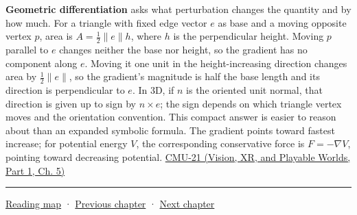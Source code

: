 \textbf{Geometric differentiation} asks what perturbation changes the quantity and by how much. For a triangle with fixed edge vector \(e\) as base and a moving opposite vertex \(p\), area is \(A=\tfrac12\|e\|h\), where \(h\) is the perpendicular height. Moving \(p\) parallel to \(e\) changes neither the base nor height, so the gradient has no component along \(e\). Moving it one unit in the height-increasing direction changes area by \(\tfrac12\|e\|\), so the gradient's magnitude is half the base length and its direction is perpendicular to \(e\). In 3D, if \(n\) is the oriented unit normal, that direction is given up to sign by \(n\times e\); the sign depends on which triangle vertex moves and the orientation convention. This compact answer is easier to reason about than an expanded symbolic formula. The gradient points toward fastest increase; for potential energy \(V\), the corresponding conservative force is \(F=-\nabla V\), pointing toward decreasing potential. \href{../07-Vision-XR-and-Playable-Worlds-P01/main.pdf\#nameddest=04-visual-computing-ii-ch036-cmu-21---dynamics-and-time-integration}{CMU-21 (Vision, XR, and Playable Worlds, Part 1, Ch. 5)}

\begin{center}\rule{0.5\linewidth}{0.5pt}\end{center}

\hyperref[volume-reading-map]{Reading map} · \hyperref[04-visual-computing-ii-ch028-visibility-queries-and-ray-intersections]{Previous chapter} · \hyperref[04-visual-computing-ii-ch030-mesh-operators-boundaries-and-diffusion]{Next chapter}
